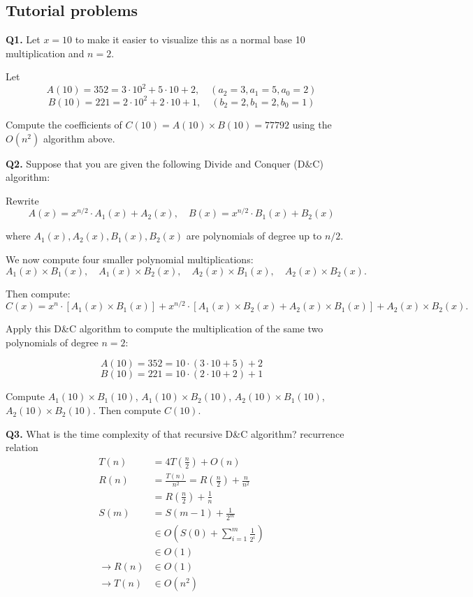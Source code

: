 \documentclass[9pt]{extarticle}
\begin{document}
\subsection{Tutorial problems}
\textbf{Q1.} Let $x = 10$ to make it easier to visualize this as a normal base 10 multiplication and $n = 2$.  

Let 
\[
A(10) = 352 = 3 \cdot 10^2 + 5 \cdot 10 + 2, \quad (a_2 = 3, a_1 = 5, a_0 = 2)
\]  
\[
B(10) = 221 = 2 \cdot 10^2 + 2 \cdot 10 + 1, \quad (b_2 = 2, b_1 = 2, b_0 = 1)
\]  

Compute the coefficients of $C(10) = A(10) \times B(10) = 77792$ using the $O(n^2)$ algorithm above.  

\vspace{1em}

\textbf{Q2.} Suppose that you are given the following Divide and Conquer (D\&C) algorithm:  

Rewrite
\[
A(x) = x^{n/2} \cdot A_1(x) + A_2(x), \quad
B(x) = x^{n/2} \cdot B_1(x) + B_2(x)
\]  

where $A_1(x), A_2(x), B_1(x), B_2(x)$ are polynomials of degree up to $n/2$.  

We now compute four smaller polynomial multiplications:
\[
A_1(x) \times B_1(x), \quad
A_1(x) \times B_2(x), \quad
A_2(x) \times B_1(x), \quad
A_2(x) \times B_2(x).
\]  

Then compute:
\[
C(x) = x^n \cdot [A_1(x) \times B_1(x)] + x^{n/2} \cdot [A_1(x)\times B_2(x) + A_2(x)\times B_1(x)] + A_2(x)\times B_2(x).
\]  

Apply this D\&C algorithm to compute the multiplication of the same two polynomials of degree $n=2$:  

\[
A(10) = 352 = 10 \cdot (3 \cdot 10 + 5) + 2
\]  
\[
B(10) = 221 = 10 \cdot (2 \cdot 10 + 2) + 1
\]  

Compute $A_1(10)\times B_1(10)$, $A_1(10)\times B_2(10)$, $A_2(10)\times B_1(10)$, $A_2(10)\times B_2(10)$.  
Then compute $C(10)$.  

\vspace{1em}

\textbf{Q3.} What is the time complexity of that recursive D\&C algorithm?  
recurrence relation
\begin{align*}
T(n) &= 4T(\frac{n}{2}) + O(n)\\
R(n) &= \frac{T(n)}{n^2} = R(\frac{n}{2}) + \frac{n}{n^2}\\
&= R(\frac{n}{2}) + \frac{1}{n}\\
S(m) &= S(m - 1) + \frac{1}{2^m}\\
&\in O\left(S(0) + \sum_{i=1}^{m} \frac{1}{2^i}\right)\\
&\in O(1)\\
\rightarrow R(n) &\in O(1)\\
\rightarrow T(n) &\in O(n^2)
\end{align*}
\vspace{1em}
\end{document}
